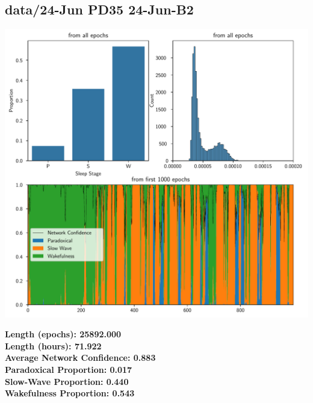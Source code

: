         \subsection*{ data/24-Jun PD35 24-Jun-B2 }
        \begin{center}
        \begin{adjustbox}{width=1\textwidth}
        \includegraphics[page=22]{figs.pdf}
        \end{adjustbox}
        \end{center}
        \large\textbf{Length (epochs): 25892.000}\\
        \textbf{Length (hours): 71.922}\\
        \textbf{Average Network Confidence: 0.883}\\
        \textbf{Paradoxical Proportion: 0.017}\\
        \textbf{Slow-Wave Proportion: 0.440}\\
        \textbf{Wakefulness Proportion: 0.543}\\
        
